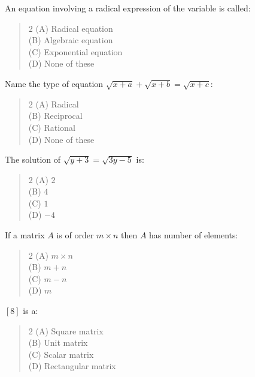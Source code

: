 \documentclass[11pt,a4paper]{article}
\begin{document}
\begin{mcqlist}
\item An equation involving a radical expression of the variable is called:
\begin{quote}\begin{multicols}{2}
\noindent (A) Radical equation \\
(B) Algebraic equation \\
(C) Exponential equation \\
(D) None of these
\end{multicols}\end{quote}

\item Name the type of equation $\sqrt{x+a}+\sqrt{x+b}=\sqrt{x+c}$:
\begin{quote}\begin{multicols}{2}
\noindent (A) Radical \\
(B) Reciprocal \\
(C) Rational \\
(D) None of these
\end{multicols}\end{quote}

\item The solution of $\sqrt{y+3}=\sqrt{3y-5}$ is:
\begin{quote}\begin{multicols}{2}
\noindent (A) $2$ \\
(B) $4$ \\
(C) $1$ \\
(D) $-4$
\end{multicols}\end{quote}

\item If a matrix $A$ is of order $m\times n$ then $A$ has number of elements:
\begin{quote}\begin{multicols}{2}
\noindent (A) $m\times n$ \\
(B) $m+n$ \\
(C) $m-n$ \\
(D) $m$
\end{multicols}\end{quote}

\item $[8]$ is a:
\begin{quote}\begin{multicols}{2}
\noindent (A) Square matrix \\
(B) Unit matrix \\
(C) Scalar matrix \\
(D) Rectangular matrix
\end{multicols}\end{quote}


\end{mcqlist}
\end{document}
